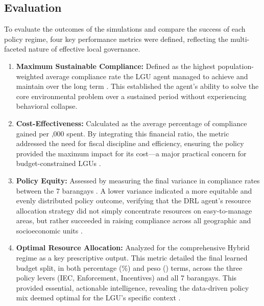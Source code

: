 \subsection{Evaluation}
To evaluate the outcomes of the simulations and compare the success of each policy regime, four key performance metrics were defined, reflecting the multi-faceted nature of effective local governance.

\begin{enumerate}
    \item \textbf{Maximum Sustainable Compliance:} Defined as the highest population-weighted average compliance rate the LGU agent managed to achieve and maintain over the long term \citep{ApostolJamoralin2024, Torkayesh2021}. This established the agent's ability to solve the core environmental problem over a sustained period without experiencing behavioral collapse.
    \item \textbf{Cost-Effectiveness:} Calculated as the average percentage of compliance gained per ,000 spent. By integrating this financial ratio, the metric addressed the need for fiscal discipline and efficiency, ensuring the policy provided the maximum impact for its cost—a major practical concern for budget-constrained LGUs \citep{MedinaMijangos2020, WorldBank2022}.
    \item \textbf{Policy Equity:} Assessed by measuring the final variance in compliance rates between the 7 barangays \citep{Jimenez2025}. A lower variance indicated a more equitable and evenly distributed policy outcome, verifying that the DRL agent’s resource allocation strategy did not simply concentrate resources on easy-to-manage areas, but rather succeeded in raising compliance across all geographic and socioeconomic units \citep{TianReview2024}.
    \item \textbf{Optimal Resource Allocation:} Analyzed for the comprehensive Hybrid regime as a key prescriptive output. This metric detailed the final learned budget split, in both percentage (\%) and peso (\textpeso) terms, across the three policy levers (IEC, Enforcement, Incentives) and all 7 barangays. This provided essential, actionable intelligence, revealing the data-driven policy mix deemed optimal for the LGU's specific context \citep{MuZhang2021, Zhao2022}.
\end{enumerate}